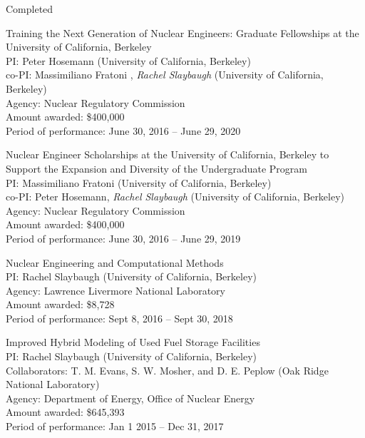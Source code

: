 \begin{rSubsection}{Completed}{}{}{}
\item Training the Next Generation of Nuclear Engineers: Graduate Fellowships at the University of California, Berkeley	\\
PI: Peter Hosemann (University of California, Berkeley) \\
\hspace*{1 em} co-PI: Massimiliano Fratoni , \textit{Rachel Slaybaugh} (University of California, Berkeley)\\
Agency: Nuclear Regulatory Commission \\
Amount awarded: \$400,000\\
Period of performance: June 30, 2016 -- June 29, 2020

\vspace*{0.3 em}
\item Nuclear Engineer Scholarships at the University of California, Berkeley to Support the Expansion and Diversity of the Undergraduate Program	\\
PI: Massimiliano Fratoni (University of California, Berkeley) \\
\hspace*{1 em} co-PI: Peter Hosemann, \textit{Rachel Slaybaugh} (University of California, Berkeley)\\
Agency: Nuclear Regulatory Commission \\
Amount awarded: \$400,000\\
Period of performance: June 30, 2016 -- June 29, 2019
\vspace*{0.3 em}

\item Nuclear Engineering and Computational Methods\\
PI: Rachel Slaybaugh (University of California, Berkeley)\\
Agency: Lawrence Livermore National Laboratory \\
Amount awarded: \$8,728\\
Period of performance: Sept 8, 2016 -- Sept 30, 2018	

\vspace*{0.3 em}
\item Improved Hybrid Modeling of Used Fuel Storage Facilities\\
PI: Rachel Slaybaugh (University of California, Berkeley)\\
\hspace*{1 em}  Collaborators: T. M. Evans, S. W. Mosher, and D. E. Peplow (Oak Ridge National Laboratory)\\
Agency: Department of Energy, Office of Nuclear Energy \\
Amount awarded: \$645,393\\
Period of performance: Jan 1 2015 -- Dec 31, 2017


\end{rSubsection}
